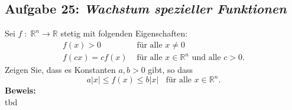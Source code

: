 \subsection*{Aufgabe 25: \mdseries\itshape Wachstum spezieller Funktionen}
Sei $f \; : \; \mathbb{R}^n \rightarrow \mathbb{R}$ stetig mit folgenden Eigenschaften:
    $$\begin{array}{rl}
        f(x) > 0 & \text{ für alle } x\not= 0\\
        f(cx) = c f(x) & \text{ für alle } x\in \mathbb{R}^n \text{ und alle }c > 0.
    \end{array}$$
    Zeigen Sie, dass es Konstanten $a,b > 0$ gibt, so dass
    $$
        a|x| \leq f(x) \leq b|x| \; \; \text{ für alle } x \in \mathbb{R}^n.
    $$
\textbf{Beweis:}\\
    tbd

